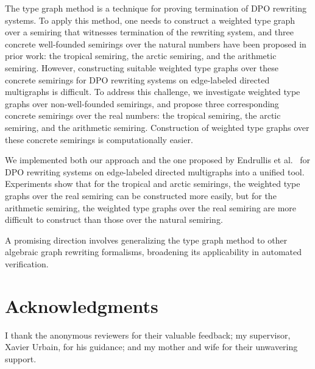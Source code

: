 The type graph method is a technique for proving termination of DPO rewriting systems. 
To apply this method, one needs to construct a weighted type graph over a semiring that witnesses termination of the rewriting system, and three concrete well-founded semirings over the natural numbers have been proposed in prior work: the tropical semiring, the arctic semiring, and the arithmetic semiring.
However, constructing suitable weighted type graphs over these concrete semirings for DPO rewriting systems on edge-labeled directed multigraphs is difficult. 
To address this challenge, we investigate weighted type graphs over non-well-founded semirings, and propose three corresponding concrete semirings over the real numbers: the tropical semiring, the arctic semiring, and the arithmetic semiring. Construction of weighted type graphs over these concrete semirings is computationally easier.
    
We implemented both our approach and the one proposed by Endrullis et al.~\cite{endrullis2024generalized_arxiv_v2} for DPO rewriting systems on edge-labeled directed multigraphs into a unified tool. Experiments show that for the tropical and arctic semirings, the weighted type graphs over the real semiring can be constructed more easily, but for the arithmetic semiring, the weighted type graphs over the real semiring are more difficult to construct than those over the natural semiring.

A promising direction involves generalizing the type graph method to other algebraic graph rewriting formalisms, broadening its applicability in automated verification. 

\section*{Acknowledgments}
I thank the anonymous reviewers for their valuable feedback; my supervisor, Xavier Urbain, for his guidance; and my mother and wife for their unwavering support.
